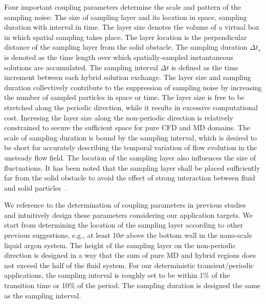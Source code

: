 \documentclass[preprint,12pt]{elsarticle}
\begin{document}
Four important coupling parameters determine the scale and pattern of
the sampling noise: The size of sampling layer and its location in space,
sampling duration with interval in time.
The layer size denotes the volume of a virtual box in which spatial sampling
takes place. The layer location is the perpendicular distance of the sampling
layer from the solid obstacle. The sampling duration ${\Delta}{t_s}$ is denoted as
the time length over which spatially-sampled instantaneous solutions are
accumulated. The sampling interval ${\Delta}t$ is defined as the time
increment between each hybrid solution exchange. 
The layer size and sampling duration collevtively contribute to
the suppression of sampling noise by increasing the number of sampled
particles in space or time.
The layer size is free to be stretched along the periodic direction,
while it results in excessive computational cost. Incresing the layer size
along the non-periodic direction is relatively constrained to secure
the sufficient space for pure CFD and MD domains.
The scale of sampling duration is bound by the sampling interval, which is
desired to be short for accurately describing the temporal variation of 
flow evolution in the unsteady flow field.
The location of the sampling layer also influences the size of fluctuations.
It has been noted that the sampling layer shall be placed sufficiently
far from the solid obstacle to avoid the effect of strong interaction
between fluid and solid particles~\cite{Nie,Yen}.

We reference to the determination of coupling parameters in previous studies~\cite{Nie,Yen,Liu,Hadjicon1,Hadjicon2,Werder,Flekkoy,Delgado1,Time_Mechanism} and intuitively design these parameters considering our application targets. We start from determining the location of the sampling layer according to other previous suggestions, e.g., at least 10$\sigma$ above the bottom wall in the nano-scale liquid argon system. The height of the sampling layer on the non-periodic direction is designed in a way that the sum of pure MD and hybrid regions does not exceed the half of the fluid system. For our deterministic transient/periodic applications, the sampling interval is roughly set to be within 1\% of the transition time or 10\% of the period. The sampling duration is designed the same as the sampling interval.
\end{document}
